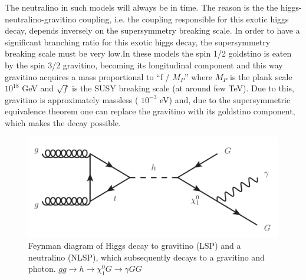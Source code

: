 The neutralino in such models will always be in time. The reason is the the higgs-neutralino-gravitino coupling, i.e. the coupling responsible for this exotic higgs decay, depends inversely on the  supersymmetry breaking scale. In order to have a significant branching ratio for this exotic higgs decay, the supersymmetry breaking scale must be very low.In these models the spin 1/2 goldstino is eaten by the spin 3/2 gravitino, becoming its longitudinal component and this way gravitino acquires a mass proportional to ``f / $M_P$'' where $M_P$ is the plank scale $10^{18}$ GeV and $\sqrt{f}$ is the SUSY breaking scale (at around few TeV). Due to this, gravitino is approximately massless ( $10^{-3}$ eV)  and, due to the supersymmetric equivalence theorem \cite{higgs-gravitino-neutralino} one can replace the gravitino with its goldstino component, which makes the decay possible. 


\begin{figure}[hbtp]
\begin{center}
   \includegraphics[width=0.6\columnwidth]{analysis_figs/feynman}
 \caption{Feynman diagram of Higgs decay to gravitino (LSP) and a neutralino (NLSP), which subsequently decays to a gravitino and photon. $gg \rightarrow  h \rightarrow  \chi_{1}^{0}  G \rightarrow  \gamma GG$}
 \label{fig:feynman}
\end{center}                                                                                                        
\end{figure} 


